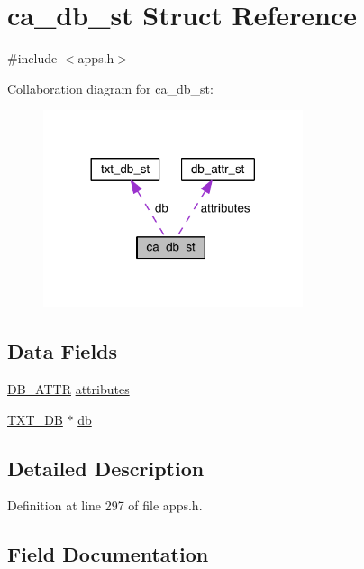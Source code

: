 \hypertarget{structca__db__st}{}\section{ca\+\_\+db\+\_\+st Struct Reference}
\label{structca__db__st}


{\ttfamily \#include $<$apps.\+h$>$}



Collaboration diagram for ca\+\_\+db\+\_\+st\+:\nopagebreak
\begin{figure}[H]
\begin{center}
\leavevmode
\includegraphics[width=216pt]{structca__db__st__coll__graph}
\end{center}
\end{figure}
\subsection*{Data Fields}
\begin{DoxyCompactItemize}
\item 
\hyperlink{apps_8h_ade35648b3fa1d78f88b6c892c578cea3}{D\+B\+\_\+\+A\+T\+TR} \hyperlink{structca__db__st_a85257425ad5ab28909d20fd1cf5120bd}{attributes}
\item 
\hyperlink{crypto_2txt__db_2txt__db_8h_af0894eb5e9381054125dc0850993c1a1}{T\+X\+T\+\_\+\+DB} $\ast$ \hyperlink{structca__db__st_aba4108833d21b1fe365d101f9c9afc3c}{db}
\end{DoxyCompactItemize}


\subsection{Detailed Description}


Definition at line 297 of file apps.\+h.



\subsection{Field Documentation}
